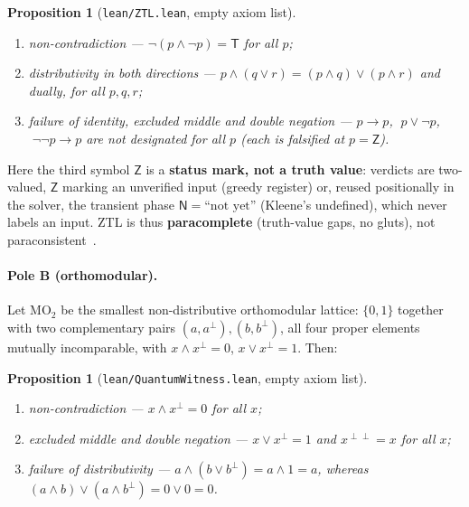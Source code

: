 \documentclass[11pt]{article}
\newtheorem{prop}[lem]{Proposition}
\theoremstyle{remark}
\newcommand{\T}{\mathsf{T}}
\newcommand{\Zmark}{\mathsf{Z}}
\newcommand{\Nph}{\mathsf{N}}
\begin{document}
\begin{prop}[\texttt{lean/ZTL.lean}, empty axiom list]\label{propA}
\leavevmode
\begin{enumerate}
\item[(i)] \emph{non-contradiction} --- $\neg(p \wedge \neg p) = \T$ for all $p$;
\item[(ii)] \emph{distributivity in both directions} ---
$p \wedge (q \vee r) = (p\wedge q) \vee (p\wedge r)$ and dually, for all $p,q,r$;
\item[(iii)] \emph{failure of identity, excluded middle and double negation} ---
$p \to p$, $\;p \vee \neg p$, $\;\neg\neg p \to p$ are not designated for all
$p$ (each is falsified at $p = \Zmark$).
\end{enumerate}
\end{prop}

Here the third symbol $\Zmark$ is a \textbf{status mark, not a truth value}:
verdicts are two-valued, $\Zmark$ marking an unverified input (greedy
register) or, reused positionally in the solver, the transient phase
$\Nph = \text{``not yet''}$ (Kleene's undefined), which never labels an input.
ZTL is thus \textbf{paracomplete} (truth-value gaps, no gluts), not
paraconsistent~\cite{ztl}.

\paragraph{Pole B (orthomodular).} Let $\mathrm{MO}_2$ be the smallest
non-distributive orthomodular lattice: $\{0, 1\}$ together with two
complementary pairs $(a, a^{\perp}), (b, b^{\perp})$, all four proper elements
mutually incomparable, with $x \wedge x^{\perp} = 0$, $x \vee x^{\perp} = 1$.
Then:

\begin{prop}[\texttt{lean/QuantumWitness.lean}, empty axiom list]\label{propB}
\leavevmode
\begin{enumerate}
\item[(i)] \emph{non-contradiction} --- $x \wedge x^{\perp} = 0$ for all $x$;
\item[(ii)] \emph{excluded middle and double negation} ---
$x \vee x^{\perp} = 1$ and $x^{\perp\perp} = x$ for all $x$;
\item[(iii)] \emph{failure of distributivity} ---
$a \wedge (b \vee b^{\perp}) = a \wedge 1 = a$, whereas
$(a\wedge b) \vee (a\wedge b^{\perp}) = 0 \vee 0 = 0$.
\end{enumerate}
\end{prop}
\end{document}
